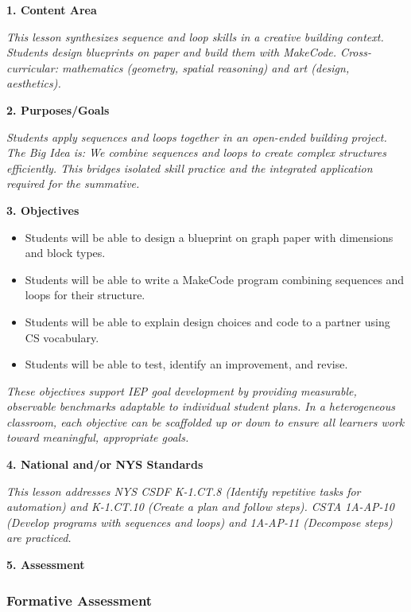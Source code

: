 \documentclass[11pt,letterpaper]{article}
\begin{document}
\textbf{1. Content Area}

\textit{This lesson synthesizes sequence and loop skills in a creative building context. Students design blueprints on paper and build them with MakeCode. Cross-curricular: mathematics (geometry, spatial reasoning) and art (design, aesthetics).}

\textbf{2. Purposes/Goals}

\textit{Students apply sequences and loops together in an open-ended building project. The Big Idea is: We combine sequences and loops to create complex structures efficiently. This bridges isolated skill practice and the integrated application required for the summative.}

\textbf{3. Objectives}

\begin{itemize}
  \item Students will be able to design a blueprint on graph paper with dimensions and block types.

  \item Students will be able to write a MakeCode program combining sequences and loops for their structure.

  \item Students will be able to explain design choices and code to a partner using CS vocabulary.

  \item Students will be able to test, identify an improvement, and revise.
\end{itemize}

\textit{These objectives support IEP goal development by providing measurable, observable benchmarks adaptable to individual student plans. In a heterogeneous classroom, each objective can be scaffolded up or down to ensure all learners work toward meaningful, appropriate goals.}

\textbf{4. National and/or NYS Standards}

\textit{This lesson addresses NYS CSDF K-1.CT.8 (Identify repetitive tasks for automation) and K-1.CT.10 (Create a plan and follow steps). CSTA 1A-AP-10 (Develop programs with sequences and loops) and 1A-AP-11 (Decompose steps) are practiced.}

\newpage
\textbf{5. Assessment}

\subsubsection{Formative Assessment}
\end{document}
